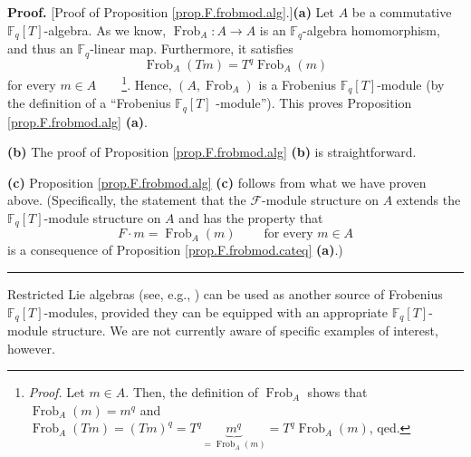\documentclass[numbers=enddot,12pt,final,onecolumn,notitlepage]{scrartcl}%
\theoremstyle{definition}
\newenvironment{proof}[1][Proof]{\noindent\textbf{#1.} }{\ \rule{0.5em}{0.5em}}
\begin{document}
\begin{proof}
[Proof of Proposition \ref{prop.F.frobmod.alg}.]\textbf{(a)} Let $A$ be a
commutative $\mathbb{F}_{q}\left[  T\right]  $-algebra. As we know,
$\operatorname*{Frob}\nolimits_{A}:A\rightarrow A$ is an $\mathbb{F}_{q}%
$-algebra homomorphism, and thus an $\mathbb{F}_{q}$-linear map. Furthermore,
it satisfies%
\[
\operatorname*{Frob}\nolimits_{A}\left(  Tm\right)  =T^{q}\operatorname*{Frob}%
\nolimits_{A}\left(  m\right)
\]
for every $m\in A$\ \ \ \ \footnote{\textit{Proof.} Let $m\in A$. Then, the
definition of $\operatorname*{Frob}\nolimits_{A}$ shows that
$\operatorname*{Frob}\nolimits_{A}\left(  m\right)  =m^{q}$ and
$\operatorname*{Frob}\nolimits_{A}\left(  Tm\right)  =\left(  Tm\right)
^{q}=T^{q}\underbrace{m^{q}}_{=\operatorname*{Frob}\nolimits_{A}\left(
m\right)  }=T^{q}\operatorname*{Frob}\nolimits_{A}\left(  m\right)  $, qed.}.
Hence, $\left(  A,\operatorname*{Frob}\nolimits_{A}\right)  $ is a Frobenius
$\mathbb{F}_{q}\left[  T\right]  $-module (by the definition of a
\textquotedblleft Frobenius $\mathbb{F}_{q}\left[  T\right]  $%
-module\textquotedblright). This proves Proposition \ref{prop.F.frobmod.alg}
\textbf{(a)}.

\textbf{(b)} The proof of Proposition \ref{prop.F.frobmod.alg} \textbf{(b)} is straightforward.

\textbf{(c)} Proposition \ref{prop.F.frobmod.alg} \textbf{(c)} follows from
what we have proven above. (Specifically, the statement that the $\mathcal{F}%
$-module structure on $A$ extends the $\mathbb{F}_{q}\left[  T\right]
$-module structure on $A$ and has the property that
\[
F\cdot m=\operatorname*{Frob}\nolimits_{A}\left(  m\right)
\ \ \ \ \ \ \ \ \ \ \text{for every }m\in A
\]
is a consequence of Proposition \ref{prop.F.frobmod.cateq} \textbf{(a)}.)
\end{proof}

Restricted Lie algebras (see, e.g., \cite{jacobson-rl}) can be used as another
source of Frobenius $\mathbb{F}_{q}\left[  T\right]  $-modules, provided they
can be equipped with an appropriate $\mathbb{F}_{q}\left[  T\right]  $-module
structure. We are not currently aware of specific examples of interest, however.
\end{document}
